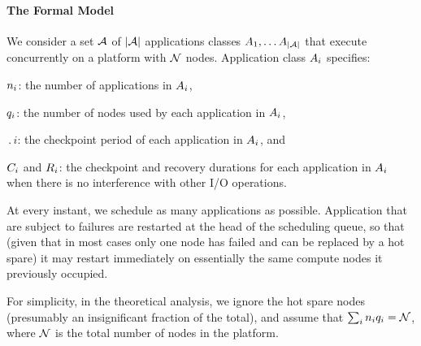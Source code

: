 \paragraph{The Formal Model}
We consider a set ${\mathcal A}$ of $|{\mathcal A}|$ applications classes
$A_{1}, \ldots A_{|{\mathcal A}|}$ that execute concurrently on a platform with
${\mathcal N}$ nodes. Application class $A_{i}$ specifies:
\begin{compactitem}
\item $n_{i}$: the number of applications in $A_{i}$,
\item $q_{i}$: the number of nodes used by each application in $A_{i}$,
\item $\period{i}$: the checkpoint period of each application in $A_{i}$, and
\item $C_{i}$ and $R_{i}$: the checkpoint and recovery durations for each application in $A_{i}$ when there is no interference with other I/O operations.
\end{compactitem}
%
%
At every instant, we schedule as many applications as possible.
Application that are subject to failures are restarted at the head of
the scheduling queue, so that (given that in most cases only one
node has failed and can be replaced by a hot spare) it may restart
immediately on essentially the same compute nodes it previously occupied.

For simplicity, in the theoretical analysis, we ignore the hot spare
nodes (presumably an insignificant fraction of the total),
and assume that $\sum_{i}n_{i} q_{i} = {\mathcal N}$, 
where ${\mathcal N}$ is the total number of nodes in the platform.


